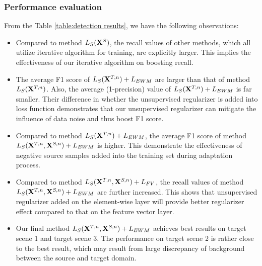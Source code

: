 \documentclass[runningheads]{llncs}
\begin{document}
\subsubsection{Performance evaluation}
From the Table \ref{table:detection results}, we have the following observations:
\begin{itemize}
    \item Compared to method $L_{S}({\bf X}^{S})$, the recall values of other methods, which all utilize iterative algorithm for training, are explicitly larger. This implies the effectiveness of our iterative algorithm on boosting recall.
    \item The average F1 score of $L_{S}({\bf X}^{T,n})+L_{EWM}$ are larger than that of method $L_{S}({\bf X}^{T,n})$. Also, the average (1-precision) value of $L_{S}({\bf X}^{T,n})+L_{EWM}$ is far smaller. Their difference in whether the unsupervised regularizer is added into loss function demonstrates that our unsupervised regularizer can mitigate the influence of data noise and thus boost F1 score.
    \item Compared to method $L_{S}({\bf X}^{T,n})+L_{EWM}$, the average F1 score of method $L_{S}({\bf X}^{T,n},{\bf X}^{S,n})+L_{EWM}$ is higher. This demonstrate the effectiveness of negative source samples added into the training set during adaptation process.
    \item Compared to method $L_{S}({\bf X}^{T,n},{\bf X}^{S,n})+L_{FV}$, the recall values of method $L_{S}({\bf X}^{T,n},{\bf X}^{S,n})+L_{EWM}$ are further increased. This shows that unsupervised regularizer added on the element-wise layer will provide better regularizer effect compared to that on the feature vector layer.
    \item Our final method $L_{S}({\bf X}^{T,n},{\bf X}^{S,n})+L_{EWM}$ achieves best results on target scene 1 and target scene 3. The performance on target scene 2 is rather close to the best result, which may result from large discrepancy of background between the source and target domain.
\end{itemize}
\end{document}
